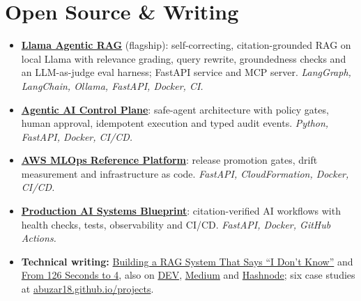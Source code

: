 \documentclass[a4paper,10pt]{article}
\begin{document}
\section*{Open Source \& Writing}
\begin{itemize}
  \item \href{https://github.com/abuzar18/llama-agentic-rag}{\textbf{Llama Agentic RAG}} (flagship): self-correcting, citation-grounded RAG on local Llama with relevance grading, query rewrite, groundedness checks and an LLM-as-judge eval harness; FastAPI service and MCP server. \textit{LangGraph, LangChain, Ollama, FastAPI, Docker, CI.}
  \item \href{https://github.com/abuzar18/agentic-ai-control-plane}{\textbf{Agentic AI Control Plane}}: safe-agent architecture with policy gates, human approval, idempotent execution and typed audit events. \textit{Python, FastAPI, Docker, CI/CD.}
  \item \href{https://github.com/abuzar18/aws-mlops-reference-platform}{\textbf{AWS MLOps Reference Platform}}: release promotion gates, drift measurement and infrastructure as code. \textit{FastAPI, CloudFormation, Docker, CI/CD.}
  \item \href{https://github.com/abuzar18/production-ai-systems-blueprint}{\textbf{Production AI Systems Blueprint}}: citation-verified AI workflows with health checks, tests, observability and CI/CD. \textit{FastAPI, Docker, GitHub Actions.}
  \item \textbf{Technical writing:} \href{https://abuzar18.github.io/blog/self-correcting-rag-llama-langgraph/}{Building a RAG System That Says ``I Don't Know''} and \href{https://abuzar18.github.io/blog/126-seconds-to-4-postgres-lambda-sqs/}{From 126 Seconds to 4}, also on \href{https://dev.to/abuzar18}{DEV}, \href{https://medium.com/@abuzarzulfiqar18}{Medium} and \href{https://abuzar18.hashnode.dev/}{Hashnode}; six case studies at \href{https://abuzar18.github.io/projects/}{abuzar18.github.io/projects}.
\end{itemize}

\end{document}
